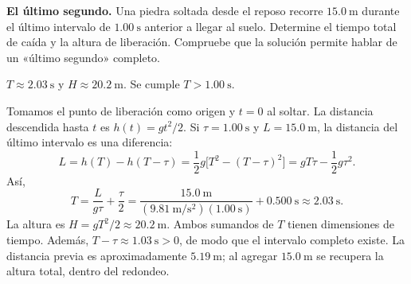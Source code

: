 \begin{ejercicio}
\textbf{El último segundo.} Una piedra soltada desde el reposo recorre \(\SI{15.0}{\meter}\) durante el último intervalo de \(\SI{1.00}{\second}\) anterior a llegar al suelo. Determine el tiempo total de caída y la altura de liberación. Compruebe que la solución permite hablar de un «último segundo» completo.
\end{ejercicio}
\begin{respuesta}
\(T\approx\SI{2.03}{\second}\) y \(H\approx\SI{20.2}{\meter}\). Se cumple \(T>\SI{1.00}{\second}\).
\end{respuesta}
\begin{explicacion}
Tomamos el punto de liberación como origen y \(t=0\) al soltar. La distancia descendida hasta \(t\) es \(h(t)=gt^2/2\). Si \(\tau=\SI{1.00}{\second}\) y \(L=\SI{15.0}{\meter}\), la distancia del último intervalo es una diferencia:
\[ L=h(T)-h(T-\tau)=\frac12g\bigl[T^2-(T-\tau)^2\bigr]=gT\tau-\frac12g\tau^2. \]
Así,
\[ T=\frac{L}{g\tau}+\frac{\tau}{2}=\frac{\SI{15.0}{\meter}}{(\SI{9.81}{\meter\per\second\squared})(\SI{1.00}{\second})}+\SI{0.500}{\second}\approx\SI{2.03}{\second}. \]
La altura es \(H=gT^2/2\approx\SI{20.2}{\meter}\). Ambos sumandos de \(T\) tienen dimensiones de tiempo. Además, \(T-\tau\approx\SI{1.03}{\second}>0\), de modo que el intervalo completo existe. La distancia previa es aproximadamente \(\SI{5.19}{\meter}\); al agregar \(\SI{15.0}{\meter}\) se recupera la altura total, dentro del redondeo.
\end{explicacion}

